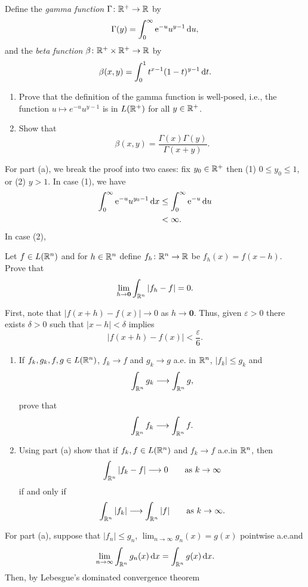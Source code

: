 \begin{problem}
  Define the \emph{gamma function} \(\Gamma\colon\mathbb{R}^+\to\mathbb{R}\) by
  \[
    \Gamma(y)=\int_0^\infty\mathrm{e}^{-u}u^{y-1}\mathop{}\!\mathrm{d} u,
  \]
  and the \emph{beta function} \(\beta\colon\mathbb{R}^+\times\mathbb{R}^+\to\mathbb{R}\) by
  \[
    \beta(x,y)=\int_0^1 t^{x-1}(1-t)^{y-1}\mathop{}\!\mathrm{d} t.
  \]
  \begin{enumerate}[label=(\alph*)]
  \item Prove that the definition of the gamma function is well-posed,
    i.e., the function \(u\mapsto e^{-u}u^{y-1}\) is in \(L(\mathbb{R}^+)\) for
    all \(y\in\mathbb{R}^+\).
  \item Show that
    \[
      \beta(x,y)=\frac{\Gamma(x)\Gamma(y)}{\Gamma(x+y)}.
    \]
  \end{enumerate}
\end{problem}
\begin{solution}
  For part (a), we break the proof into two cases: fix \(y_0\in\mathbb{R}^+\)
  then (1) \(0\leq y_0\leq 1\), or (2) \(y>1\). In case (1), we have
  \begin{align*}
    \int_0^\infty \mathrm{e}^{-u}u^{y_0-1}\mathop{}\!\mathrm{d} x
    &\leq\int_0^\infty\mathrm{e}^{-u}\mathop{}\!\mathrm{d} u\\
    &<\infty.
  \end{align*}
  In case (2),
\end{solution}

\begin{problem}
  Let \(f\in L(\mathbb{R}^n)\) and for \(h\in\mathbb{R}^n\) define
  \(f_{h}\colon\mathbb{R}^n\to\mathbb{R}\) be \(f_{h}( x )= f( x -h)\). Prove that
  \[
    \lim_{h\to\mathbf{0}}\int_{\mathbb{R}^n}\left|f_{h}-f\right|=0.
  \]
\end{problem}
\begin{solution}
  First, note that \(|f(x+h)-f(x)|\to 0\) as \(h\to\mathbf{0}\). Thus,
  given \(\varepsilon>0\) there exists \(\delta>0\) such that
  \(|x-h|<\delta\) implies
  \[
    |f(x+h)-f(x)|<\frac{\varepsilon}{6}.
  \]
\end{solution}

\begin{problem}
\begin{enumerate}[label=(\alph*)]
\item If \(f_k,g_k,f,g\in L(\mathbb{R}^n)\), \(f_k\to f\) and \(g_k\to g\) a.e.\@
  in \(\mathbb{R}^n\), \(|f_k|\leq g_k\) and
  \[
    \int_{\mathbb{R}^n}g_k\longrightarrow\int_{\mathbb{R}^n}g,
  \]

  prove that
  \[
    \int_{\mathbb{R}^n} f_k\longrightarrow\int_{\mathbb{R}^n}f.
  \]
\item Using part (a) show that if \(f_k,f\in L(\mathbb{R}^n)\) and \(f_k\to f\)
  a.e.\@ in \(\mathbb{R}^n\), then
  \[
    \int_{\mathbb{R}^n}|f_k-f|\longrightarrow 0\qquad\text{as \(k\to\infty\)}
  \]
  if and only if
  \[
    \int_{\mathbb{R}^n}|f_k|\longrightarrow\int_{\mathbb{R}^n}|f|\qquad\text{as
      \(k\to\infty\)}.
  \]
\end{enumerate}
\end{problem}
\begin{solution}
  For part (a), suppose that \(|f_n|\leq g_n\),
  \(\lim_{n\to\infty}g_n(x)=g(x)\) pointwise a.e.\@ and
  \[
    \lim_{n\to\infty}\int_{\mathbb{R}^n}g_n(x)\mathop{}\!\mathrm{d} x=\int_{\mathbb{R}^n} g(x)\mathop{}\!\mathrm{d} x.
  \]
  Then, by Lebesgue's dominated convergence theorem
\end{solution}


